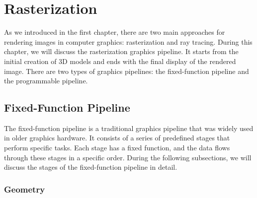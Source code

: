 \chapter{Rasterization}

As we introduced in the first chapter, there are two main approaches for rendering images in computer graphics: rasterization and ray tracing. During this chapter, we will discuss the rasterization graphics pipeline. It starts from the initial creation of 3D models and ends with the final display of the rendered image. There are two types of graphics pipelines: the fixed-function pipeline and the programmable pipeline.
\section{Fixed-Function Pipeline}

The fixed-function pipeline is a traditional graphics pipeline that was widely used in older graphics hardware. It consists of a series of predefined stages that perform specific tasks. Each stage has a fixed function, and the data flows through these stages in a specific order. During the following subsections, we will discuss the stages of the fixed-function pipeline in detail.

\subsection{Geometry}


